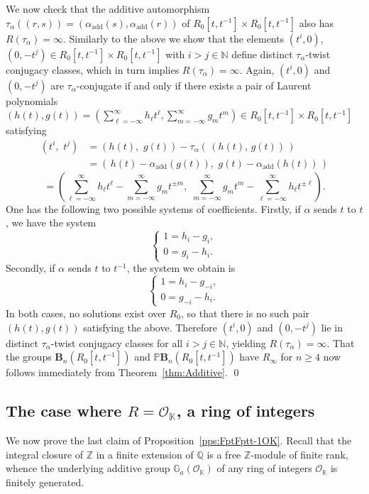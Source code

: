 \documentclass[a4paper,11pt]{amsart}
\numberwithin{equation}{section}
\theoremstyle{plain}
\theoremstyle{definition}
\newcommand{\N}{\mathbb{N}}
\newcommand{\Z}{\mathbb{Z}}
\newcommand{\Q}{\mathbb{Q}}
\newcommand{\K}{\mathbb{K}}
\newcommand{\laurent}[1]{#1[t,t^{-1}]}
\newcommand{\addi}[1]{#1_{\text{add}}} %
\newcommand{\ri}{\mathcal{O}}
\newcommand{\Addi}{\mathbb{G}_{a}} %
\newcommand{\mbB}{\mathbf{B}} %
\newcommand{\PB}{\mathbb{P}\mathbf{B}} %
\newcommand{\Ri}{R_{\infty}} %
\begin{document}
We now check that the additive automorphism $\tau_\alpha((r,s)) = (\addi{\alpha}(s),\addi{\alpha}(r))$ of $\laurent{R_0} \times \laurent{R_0}$ also has $R(\tau_\alpha) = \infty$. Similarly to the above we show that the elements $(t^i,0)$, $(0,-t^j) \in \laurent{R_0} \times \laurent{R_0}$ with $i > j \in \N$ define distinct $\tau_\alpha$-twist conjugacy classes, which in turn implies $R(\tau_\alpha) = \infty$. Again, $(t^i,0)$ and $(0,-t^j)$ are $\tau_\alpha$-conjugate if and only if there exists a pair of Laurent polynomials $(h(t), g(t)) = (\sum_{\ell=-\infty}^\infty h_\ell t^\ell, \sum_{m=-\infty}^\infty g_m t^m) \in R_0[t,t^{-1}] \times R_0[t,t^{-1}]$ satisfying 
\begin{align*} 
(t^i, \, \, t^j) & = (h(t), \, \, g(t)) - \tau_\alpha( \, (h(t), \, g(t)) \, ) \\
 & = (\, h(t) - \addi{\alpha}(g(t)), \, \, g(t) - \addi{\alpha}(h(t)) \, )
\end{align*}
\[ = \left( \sum_{\ell=-\infty}^\infty h_\ell t^\ell - \sum_{m=-\infty}^\infty g_m t^{\pm m} , \, \, \sum_{m=-\infty}^\infty g_m t^m - \sum_{\ell=-\infty}^\infty h_\ell t^{\pm \ell} \right).
\]
One has the following two possible systems of coefficients. Firstly, if $\alpha$ sends $t$ to $t$, we have the system 
\[ \begin{cases}
 1 = h_i - g_i, \\
 0 = g_i - h_i. 
\end{cases}\]
Secondly, if $\alpha$ sends $t$ to $t^{-1}$, the system we obtain is 
\[ \begin{cases}
 1 = h_i - g_{-i}, \\
 0 = g_{-i} - h_i. 
\end{cases}\]
In both cases, no solutions exist over $R_0$, so that there is no such pair $(h(t), g(t))$ satisfying the above. Therefore $(t^i,0)$ and $(0,-t^j)$ lie in distinct $\tau_\alpha$-twist conjugacy classes for all $i > j \in \N$, yielding $R(\tau_\alpha) = \infty$. That the groups $\mbB_n(\laurent{R_0})$ and $\PB_n(\laurent{R_0})$ have $\Ri$ for $n\geq 4$ now follows immediately from Theorem~\ref{thm:Additive}. \qed

\subsection{The case where \texorpdfstring{$R = \ri_\K$}{R = Ok}, a ring of integers} \label{sec:OK} We now prove the last claim of Proposition~\ref{pps:FptFptt-1OK}. 
Recall that the integral closure of $\Z$ in a finite extension of $\Q$ is a free $\Z$-module of finite rank, whence the underlying additive group $\Addi(\ri_\K)$ of any ring of integers $\ri_\K$ is finitely generated. 
\end{document}
